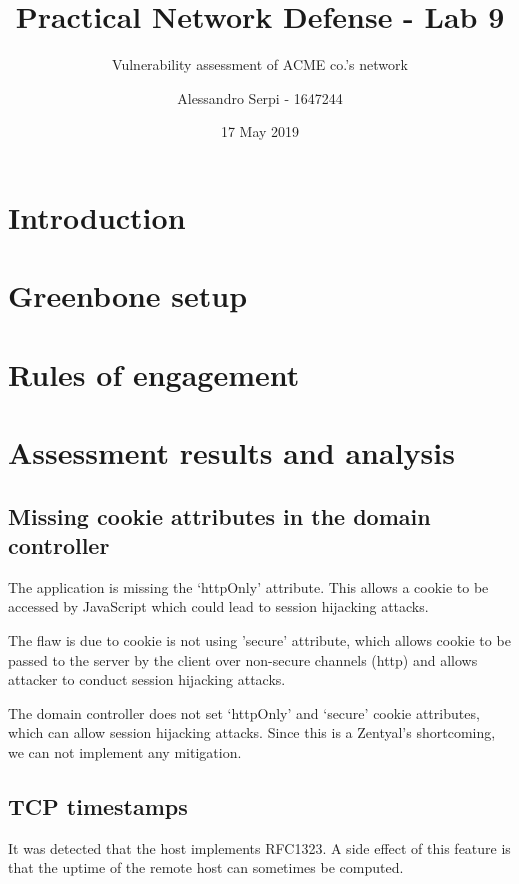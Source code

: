 \documentclass[draft]{homework}
\title{Practical Network Defense - Lab 9}
\subtitle{Vulnerability assessment of ACME co.'s network}
\author{Alessandro Serpi - 1647244}
\date{17 May 2019}
\begin{document}
    \maketitle
    \tableofcontents
    
    
    \pagebreak
    \section{Introduction}
    
    
    \section{Greenbone setup}
    
    
    \section{Rules of engagement}
    
    
    \section{Assessment results and analysis}
    \subsection{Missing cookie attributes in the domain controller}
    \begin{displayquote}
        The application is missing the `httpOnly' attribute.
        \textelp{}
        This allows a cookie to be accessed by JavaScript which could lead to session hijacking attacks.
    \end{displayquote}
    \begin{displayquote}
        The flaw is due to cookie is not using 'secure' attribute, which allows cookie to be passed to the server by the client over non-secure channels (http) and allows attacker to conduct session hijacking attacks.
    \end{displayquote}
    The domain controller does not set `httpOnly' and `secure' cookie attributes, which can allow session hijacking attacks.
    Since this is a Zentyal's shortcoming, we can not implement any mitigation.
    
    \subsection{TCP timestamps}
    \begin{displayquote}
        It was detected that the host implements RFC1323.
        \textelp{}
        A side effect of this feature is that the uptime of the remote host can sometimes be computed.
    \end{displayquote}
    
\end{document}
